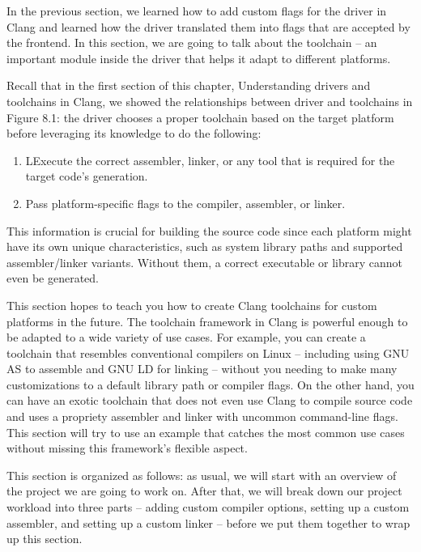 
In the previous section, we learned how to add custom flags for the driver in Clang and learned how the driver translated them into flags that are accepted by the frontend. In this section, we are going to talk about the toolchain – an important module inside the driver that helps it adapt to different platforms.

Recall that in the first section of this chapter, Understanding drivers and toolchains in Clang, we showed the relationships between driver and toolchains in Figure 8.1: the driver chooses a proper toolchain based on the target platform before leveraging its knowledge to do the following:

\begin{enumerate}
\item LExecute the correct assembler, linker, or any tool that is required for the target code's generation.

\item Pass platform-specific flags to the compiler, assembler, or linker.
\end{enumerate}

This information is crucial for building the source code since each platform might have its own unique characteristics, such as system library paths and supported assembler/linker variants. Without them, a correct executable or library cannot even be generated.

This section hopes to teach you how to create Clang toolchains for custom platforms in the future. The toolchain framework in Clang is powerful enough to be adapted to a wide variety of use cases. For example, you can create a toolchain that resembles conventional compilers on Linux – including using GNU AS to assemble and GNU LD for linking – without you needing to make many customizations to a default library path or compiler flags. On the other hand, you can have an exotic toolchain that does not even use Clang to compile source code and uses a propriety assembler and linker with uncommon command-line flags. This section will try to use an example that catches the most common use cases without missing this framework's flexible aspect.

This section is organized as follows: as usual, we will start with an overview of the project we are going to work on. After that, we will break down our project workload into three parts – adding custom compiler options, setting up a custom assembler, and setting up a custom linker – before we put them together to wrap up this section.

